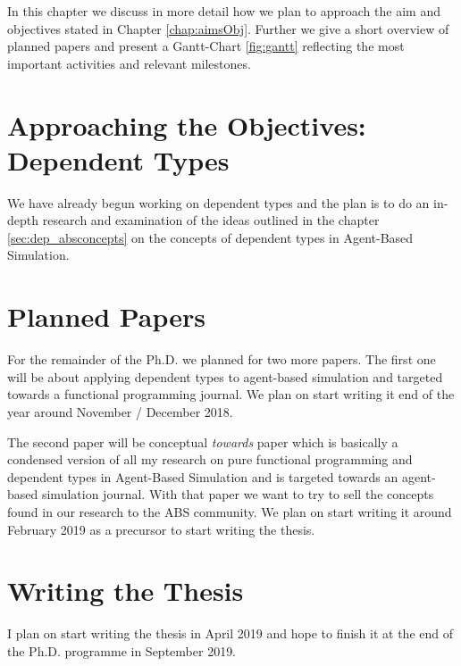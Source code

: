 
In this chapter we discuss in more detail how we plan to approach the aim and objectives stated in Chapter \ref{chap:aimsObj}. Further we give a short overview of planned papers and present a Gantt-Chart \ref{fig:gantt} reflecting the most important activities and relevant milestones.

\section{Approaching the Objectives: Dependent Types}
We have already begun working on dependent types and the plan is to do an in-depth research and examination of the ideas outlined in the chapter \ref{sec:dep_absconcepts} on the concepts of dependent types in Agent-Based Simulation.

\section{Planned Papers}
For the remainder of the Ph.D. we planned for two more papers.
The first one will be about applying dependent types to agent-based simulation and targeted towards a functional programming journal. We plan on start writing it end of the year around November / December 2018.

The second paper will be conceptual \textit{towards} paper which is basically a condensed version of all my research on pure functional programming and dependent types in Agent-Based Simulation and is targeted towards an agent-based simulation journal. With that paper we want to try to sell the concepts found in our research to the ABS community. We plan on start writing it around February 2019 as a precursor to start writing the thesis.

\section{Writing the Thesis}
I plan on start writing the thesis in April 2019 and hope to finish it at the end of the Ph.D. programme in September 2019.

\clearpage

